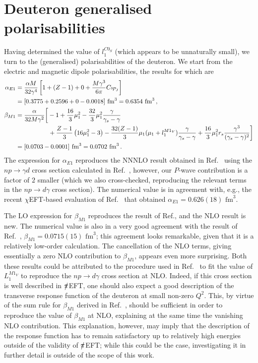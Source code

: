 \documentclass[prl,
twocolumn,
showpacs,preprintnumbers,amsmath,amssymb,
superscriptaddress,
a4paper,nofootinbib,longbibliography]{revtex4-2}
\def\piEFT/{$\slashed{\pi}$EFT}
\begin{document}
\section{Deuteron generalised polarisabilities}
Having determined the value of $l_1^{C0_S}$ (which appears to be unnaturally small), we turn to the (generalised) polarisabilities of the deuteron. We start from the electric and magnetic dipole polarisabilities, the results for which are
\begin{align}
    \alpha_{E1} & = \frac{\alpha M}{32\gamma^4}\left[1+(Z-1)+0+\frac{M\gamma^3}{6\pi}C_{{}^{3\!}P_J}\right] \nonumber \\
    & = [0.3775+0.2596+0-0.0018]\text{ fm}^3 = 0.6354\text{ fm}^3\,,\\
    \beta_{M1} & = \frac{\alpha}{32M\gamma^2}
    \bigg[-1+\frac{16}{3}\mu_1^2-\frac{32}{3}\mu_1^2\frac{\gamma}{\gamma_s-\gamma } \nonumber \\
&\hphantom{=\frac{\alpha}{32M\gamma^2}\bigg[\,\,}
+\frac{Z-1}{3} \left(16\mu_1^2-3\right)
-\frac{32(Z-1)}{3}\mu_1(\mu_1+l_1^{M1_V}) \frac{\gamma}{\gamma_s-\gamma}
+\frac{16}{3}\mu_1^2 r_s \frac{\gamma^3}{(\gamma_s-\gamma)^2}
   \bigg]\nonumber\\
& = [0.0703-0.0001]\text{ fm}^3 = 0.0702\text{ fm}^3\,.
\end{align}
The expression for $\alpha_{E1}$ reproduces the NNNLO result obtained in Ref.~\cite{Phillips:1999hh} using the $np\to\gamma d$ cross section calculated in Ref.~\cite{Rupak:1999rk}, however, our $P$-wave contribution is a factor of $2$ smaller (which we also cross-checked, reproducing the relevant terms in the $np\to d\gamma$ cross section). The numerical value is in agreement with, e.g., the recent $\chi$EFT-based evaluation of Ref.~\cite{Acharya:2020bxf} that obtained $\alpha_{E1}=0.626(18)\text{ fm}^3$. 

The LO expression for $\beta_{M1}$ reproduces the result of Ref.\cite{Ji:2003ia}, and the NLO result is new. The numerical value is also in a very good agreement with the result of Ref.~\cite{Acharya:2020bxf}, $\beta_{M1}=0.0715(15)\text{ fm}^3$; this agreement looks remarkable, given that it is a relatively low-order calculation. The cancellation of the NLO terms, giving essentially a zero NLO contribution to $\beta_{M1}$, appears even more surprising. Both these results could be attributed to the procedure used in Ref.~\cite{Rupak:1999rk} to fit the value of $L_1^{M1_V}$ to reproduce the $np\to d\gamma$ cross section at NLO. Indeed, if this cross section is well described in \piEFT/, one should also expect a good description of the transverse response function of the deuteron at small non-zero $Q^2$. This, by virtue of the sum rule for $\beta_{M1}$ derived in Ref.~\cite{Gorchtein:2015eoa}, should be sufficient in order to reproduce the value of $\beta_{M1}$ at NLO, explaining at the same time the vanishing NLO contribution. This explanation, however, may imply that the description of the response function has to remain satisfactory up to relatively high energies outside of the validity of \piEFT/; while this could be the case, investigating it in further detail is outside of the scope of this work.
\end{document}
